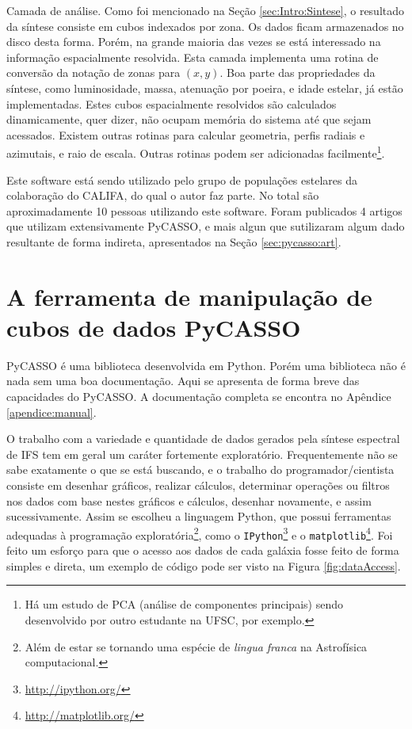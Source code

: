Camada de análise. Como foi mencionado na Seção \ref{sec:Intro:Sintese}, o
resultado da síntese consiste em cubos indexados por zona. Os dados ficam
armazenados no disco desta forma. Porém, na grande maioria das vezes se está
interessado na informação espacialmente resolvida. Esta camada implementa uma rotina de
conversão da notação de zonas para $(x, y)$. Boa parte das propriedades da
síntese, como luminosidade, massa, atenuação por poeira, e idade estelar, já
estão implementadas. Estes cubos espacialmente resolvidos são calculados
dinamicamente, quer dizer, não ocupam memória do sistema até que sejam
acessados. Existem outras rotinas para calcular geometria, perfis radiais e
azimutais, e raio de escala. Outras rotinas podem ser adicionadas
facilmente\footnote{Há um estudo de PCA (análise de componentes principais)
sendo desenvolvido por outro estudante na UFSC, por exemplo.}.

Este software está sendo utilizado pelo grupo de populações estelares da
colaboração do CALIFA, do qual o autor faz parte. No total são aproximadamente
10 pessoas utilizando este software. Foram publicados 4 artigos que utilizam
extensivamente PyCASSO, e mais algun que sutilizaram algum dado resultante de
forma indireta, apresentados na Seção \ref{sec:pycasso:art}.



\section{A ferramenta de manipulação de cubos de dados PyCASSO}
\label{sec:pycasso:Pycasso}

PyCASSO é uma biblioteca desenvolvida em Python. Porém uma biblioteca não é nada
sem uma boa documentação. Aqui se apresenta de forma breve das capacidades do
PyCASSO. A documentação completa se encontra no Apêndice \ref{apendice:manual}.

O trabalho com a variedade e quantidade de dados gerados pela síntese espectral
de IFS tem em geral um caráter fortemente exploratório. Frequentemente não se
sabe exatamente o que se está buscando, e o trabalho do programador/cientista
consiste em desenhar gráficos, realizar cálculos, determinar operações ou
filtros nos dados com base nestes gráficos e cálculos, desenhar novamente, e
assim sucessivamente. Assim se escolheu a linguagem Python, que possui
ferramentas adequadas à programação exploratória\footnote{Além de estar se
tornando uma espécie de {\em lingua franca} na Astrofísica computacional.}, como
o \texttt{IPython}\footnote{\url{http://ipython.org/}} e o
\texttt{matplotlib}\footnote{\url{http://matplotlib.org/}}. Foi feito um esforço
para que o acesso aos dados de cada galáxia fosse feito de forma simples e
direta, um exemplo de código pode ser visto na Figura \ref{fig:dataAccess}.

